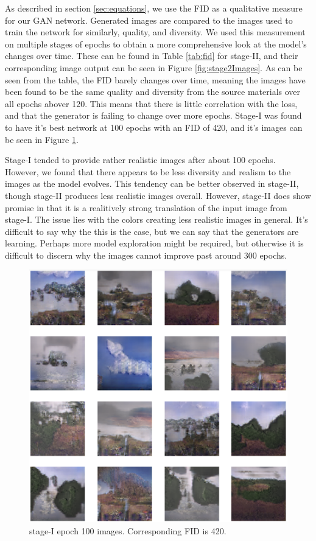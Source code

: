 \documentclass{article}
\begin{document}
	As described in section \ref{sec:equations}, we use the FID as a qualitative measure for our GAN network. Generated images are compared to the images used to train the network for similarly, quality, and diversity. We used this measurement on multiple stages of epochs to obtain a more comprehensive look at the model’s changes over time. These can be found in Table \ref{tab:fid} for stage-II, and their corresponding image output can be seen in Figure \ref{fig:stage2Images}. As can be seen from the table, the FID barely changes over time, meaning the images have been found to be the same quality and diversity from the source materials over all epochs abover 120. This means that there is little correlation with the loss, and that the generator is failing to change over more epochs. Stage-I was found to have it's best network at 100 epochs with an FID of 420, and it's images can be seen in Figure \ref{fig:stage1Images}.

	Stage-I tended to provide rather realistic images after about 100 epochs. However, we found that there appears to be less diversity and realism to the images as the model evolves. This tendency can be better observed in stage-II, though stage-II produces less realistic images overall. However, stage-II does show promise in that it is a realitively strong translation of the input image from stage-I. The issue lies with the colors creating less realistic images in general. It's difficult to say why the this is the case, but we can say that the generators are learning. Perhaps more model exploration might be required, but otherwise it is difficult to discern why the images cannot improve past around 300 epochs.
	
	\begin{figure}[h]
	\centering
	\includegraphics[scale=0.4]{images/StageI_epoch100_FID420.png}
	\caption{stage-I epoch 100 images. Corresponding FID is 420.}
	\label{fig:stage1Images}
	\end{figure}
\end{document}
